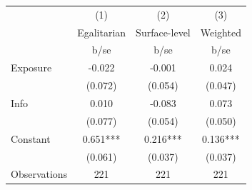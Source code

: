 {
\def\sym#1{\ifmmode^{#1}\else\(^{#1}\)\fi}
\begin{tabular}{l*{3}{c}}
\hline\hline
                    &\multicolumn{1}{c}{(1)}&\multicolumn{1}{c}{(2)}&\multicolumn{1}{c}{(3)}\\
                    &\multicolumn{1}{c}{Egalitarian}&\multicolumn{1}{c}{Surface-level}&\multicolumn{1}{c}{Weighted}\\
                    &        b/se   &        b/se   &        b/se   \\
\hline
Exposure            &      -0.022   &      -0.001   &       0.024   \\
                    &     (0.072)   &     (0.054)   &     (0.047)   \\
Info                &       0.010   &      -0.083   &       0.073   \\
                    &     (0.077)   &     (0.054)   &     (0.050)   \\
Constant            &       0.651***&       0.216***&       0.136***\\
                    &     (0.061)   &     (0.037)   &     (0.037)   \\
\hline
Observations        &         221   &         221   &         221   \\
\hline\hline
\end{tabular}
}
